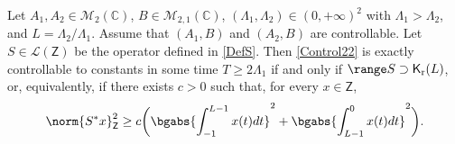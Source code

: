 \begin{lemm}
\label{LemmIneqObservS}
Let $A_1, A_2 \in \mathcal M_2(\mathbb C)$, $B \in \mathcal M_{2, 1}(\mathbb C)$, $(\Lambda_1, \Lambda_2) \in (0, +\infty)^2$ with $\Lambda_1 > \Lambda_2$, and $L = \Lambda_2 / \Lambda_1$. Assume that $(A_1, B)$ and $(A_2, B)$ are controllable. Let $S \in \mathcal L(\mathsf Z)$ be the operator defined in \eqref{DefS}. Then \eqref{Control22} is exactly controllable to constants in some time $T \geq 2 \Lambda_1$ if and only if $\range S \supset \mathsf K_{\mathrm r}(L)$, or, equivalently, if there exists $c > 0$ such that, for every $x \in \mathsf Z$,
\begin{equation}
\label{IneqObservS}
\norm{S^\ast x}_{\mathsf Z}^2 \geq c \biggl(\bgabs{\int_{-1}^{L-1} x(t) dt}^2 + \bgabs{\int_{L-1}^{0} x(t) dt}^2\biggr).
\end{equation}
\end{lemm}


